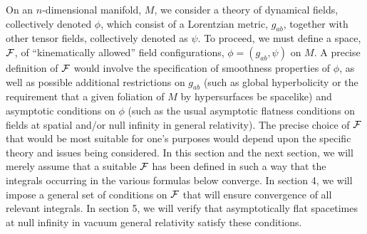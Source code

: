 On an $n$-dimensional manifold, $M$, we consider a theory of dynamical
fields, collectively denoted $\phi$, which consist of a Lorentzian
metric, $g_{ab}$, together with other tensor fields, collectively
denoted as $\psi$. To proceed, we must define a space, ${\cal F}$, of
``kinematically allowed'' field configurations, $\phi = (g_{ab},
\psi)$ on $M$. A precise definition of ${\cal F}$ would involve the
specification of smoothness properties of $\phi$, as well as possible
additional restrictions on $g_{ab}$ (such as global hyperbolicity or
the requirement that a given foliation of $M$ by hypersurfaces be
spacelike) and asymptotic conditions on $\phi$ (such as the usual
asymptotic flatness conditions on fields at spatial and/or null
infinity in general relativity). The precise choice of ${\cal F}$ that
would be most suitable for one's purposes would depend upon the
specific theory and issues being considered. In this section and the
next section, we will merely assume that a suitable ${\cal F}$ has
been defined in such a way that the integrals occurring in the various
formulas below converge.  In section 4, we will impose a general set
of conditions on $\cal F$ that will ensure convergence of all relevant
integrals. In section 5, we will verify that asymptotically flat
spacetimes at null infinity in vacuum general relativity satisfy these
conditions.

